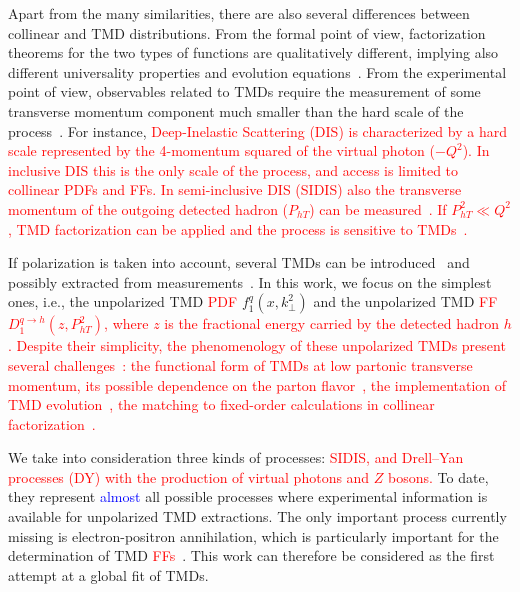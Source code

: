 \documentclass[aps,preprintnumbers,showpacs,nofootinbib,superscriptaddress,floatfix]{revtex4}
\newcommand{\T}{\perp}
\begin{document}
Apart from the many similarities, there are also several differences between collinear and TMD distributions. From the formal point of view, factorization theorems for the two types of functions are qualitatively different, implying also different universality properties and evolution equations~\cite{Rogers:2015sqa}. From the experimental point
of view, observables related to TMDs require the measurement of some transverse
momentum component much smaller than the hard scale of the process~\cite{Bacchetta:2016ccz,Radici:2016hbh}. For
instance, \textcolor{red}{Deep-Inelastic Scattering (DIS) is characterized by a hard scale represented by the
4-momentum squared of the virtual photon ($-Q^2$). In inclusive DIS this is the only scale of the process, and access is limited to collinear PDFs and FFs. In semi-inclusive DIS (SIDIS) also the transverse momentum of the outgoing detected 
hadron ($P_{hT}$) can be measured~\cite{Mulders:1995dh,Bacchetta:2006tn}. If $P_{hT}^2\ll Q^2$, TMD
factorization can be applied and the process is sensitive to TMDs~\cite{Collins:2011zzd}. }


If polarization is taken into account, several TMDs can be introduced~\cite{Mulders:1995dh,Bacchetta:2000jk,Boer:2016xqr} and possibly extracted from measurements~\cite{Angeles-Martinez:2015sea,Aschenauer:2015ndk,Boglione:2015zyc}. In this work, we focus on the simplest ones, i.e., the unpolarized TMD \textcolor{red}{PDF} $f_1^q(x,k_{\T}^2)$ and the unpolarized TMD \textcolor{red}{FF} \textcolor{red}{$D_1^{q \to h}(z,P_{hT}^2)$, where $z$ is the fractional energy carried by the detected hadron $h$. Despite their simplicity, the phenomenology of these unpolarized TMDs present several challenges~\cite{Signori:2016lvd}: the functional form of TMDs at low partonic transverse momentum, its possible dependence on the parton flavor~\cite{Signori:2013mda}, the implementation of TMD evolution~\cite{Bacchetta:2015ora,Rogers:2015sqa}, the matching to fixed-order calculations in collinear factorization~\cite{Collins:2016hqq}. } 

We take into consideration three kinds of processes: \textcolor{red}{SIDIS, and Drell--Yan processes (DY) with the production of virtual photons and $Z$ bosons.} To date, they represent \textcolor{blue}{almost} all possible processes where experimental information is available for unpolarized TMD extractions. The only important
process currently missing is electron-positron annihilation, which is particularly important for the determination of TMD \textcolor{red}{FFs~\cite{Bacchetta:2015ora}}. This work can therefore be considered as the first attempt at a global fit of TMDs. 
\end{document}
